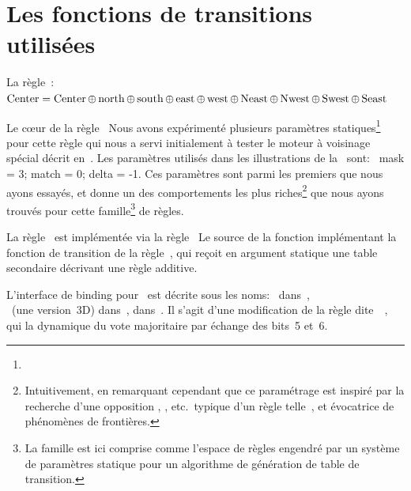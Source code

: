 \chapter{Les fonctions de transitions utilis\'ees}

\label{rule-xor9}%
La r\`egle~:\\
$\operatorname{Center}= \operatorname{Center} \oplus \operatorname{north} \oplus \operatorname{south} \oplus \operatorname{east} \oplus \operatorname{west} \oplus\\
 \operatorname{Neast} \oplus \operatorname{Nwest} \oplus \operatorname{Swest} \oplus \operatorname{Seast}$

%
{}%
{Le c{\oe}ur de la r\`egle~}%
{\label{rule-qmean}%
  Nous avons exp\'eriment\'e plusieurs param\`etres statiques\footnote{%
    } %
  pour cette r\`egle qui nous a servi initialement \`a tester le moteur \`a
  voisinage sp\'ecial d\'ecrit en~. %
  Les param\`etres utilis\'es dans les illustrations de
  la~ sont:~%
  mask = 3; match = 0; delta = -1. %
  Ces param\`etres sont parmi les premiers que nous ayons essay\'es, et
  donne un des comportements les plus riches\footnote{%
    Intuitivement, en remarquant cependant que
    ce para\-m\'e\-trage est ins\-pir\'e par la recherche d'une opposition
    ,
    , etc.\  typique d'un r\`egle
    telle~, et \'evocatrice de ph\'enom\`enes de fronti\`eres.} %
  que nous ayons trouv\'es pour cette famille\footnote{%
    La famille est ici comprise comme l'espace de r\`egles engendr\'e par
    un syst\`eme de param\`etres statique pour un algorithme de g\'en\'eration de
    table de transition.} %
  de r\`egles.}

%
{}%
{La r\`egle~ est impl\'ement\'ee via la r\`egle~}%
{\label{rule-anneal}%
  Le source de la fonction  impl\'ementant la fonction de
  transition de la r\`egle~, qui re\c{c}oit en argument statique
  une table secondaire d\'ecrivant une r\`egle additive. %
  }%

%
{}%
{L'interface de binding  pour~}%
{ est d\'ecrite sous les noms:~%
     dans~\cite{Vichniac86}, \\%
    ~(une version~3D) dans~\cite{Pickover92b}, %
     dans~\cite{Toffoli87}. %
    Il s'agit d'une modification de la r\`egle
    dite~~\cite{Toffoli87}, qui
     la dynamique du vote majoritaire par \'echange des
    bits~5 et~6.}

